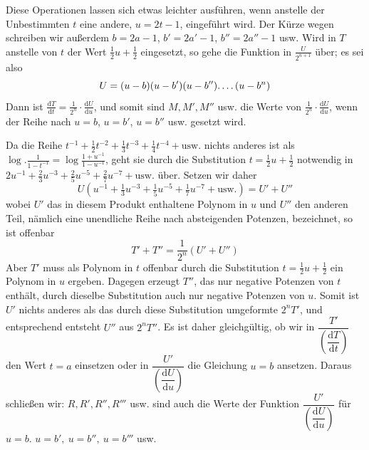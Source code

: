 Diese Operationen lassen sich etwas leichter ausführen, wenn anstelle der Unbestimmten $t$ eine andere, $u=2t-1$, eingeführt wird. Der Kürze wegen schreiben wir außerdem $b=2a-1$, $b'=2a'-1$, $b''=2a''-1$ usw. Wird in $T$ anstelle von $t$ der Wert $\tfrac12u+\tfrac12$ eingesetzt, so gehe die Funktion in $\frac{U}{2^{n+1}}$ über; es sei also
\[
U=(u-b)(u-b')(u-b'')\ldotp\ldotp\ldotp\ldotp(u-b^n)
\]
Dann ist $\frac{\mathrm{d}T}{\mathrm{d}t}=\frac{1}{2^n}\cdot\frac{\mathrm{d}U}{\mathrm{d}u}$, und somit sind $M,M',M''$ usw. die Werte von $\frac{1}{2^n}\cdot\frac{\mathrm{d}U}{\mathrm{d}u}$, wenn der Reihe nach $u=b$, $u=b'$, $u=b''$ usw. gesetzt wird.

Da die Reihe $t^{-1}+\tfrac12t^{-2}+\tfrac13t^{-3}+\tfrac14t^{-4}+\text{usw.}$ nichts anderes ist als $\log.\frac{1}{1-t^{-1}}=\log\frac{1+u^{-1}}{1-u^{-1}}$, geht sie durch die Substitution $t=\tfrac12u+\tfrac12$ notwendig in $2u^{-1}+\tfrac23u^{-3}+\tfrac25u^{-5}+\tfrac27u^{-7}+\text{usw.}$ über. Setzen wir daher
\[
U(u^{-1}+\tfrac13u^{-3}+\tfrac15u^{-5}+\tfrac17u^{-7}+\text{usw.})=U'+U''
\]
wobei $U'$ das in diesem Produkt enthaltene Polynom in $u$ und $U''$ den anderen Teil, nämlich eine unendliche Reihe nach absteigenden Potenzen, bezeichnet, so ist offenbar
\[
T'+T''=\frac{1}{2^n}(U'+U'')
\]
Aber $T'$ muss als Polynom in $t$ offenbar durch die Substitution $t=\tfrac12u+\tfrac12$ ein Polynom in $u$ ergeben. Dagegen erzeugt $T''$, das nur negative Potenzen von $t$ enthält, durch dieselbe Substitution auch nur negative Potenzen von $u$. Somit ist $U'$ nichts anderes als das durch diese Substitution umgeformte $2^nT'$, und entsprechend entsteht $U''$ aus $2^nT''$. Es ist daher gleichgültig, ob wir in $\dfrac{T'}{\left(\dfrac{\mathrm{d}T}{\mathrm{d}t}\right)}$ den Wert $t=a$ einsetzen oder in $\dfrac{U'}{\left(\dfrac{\mathrm{d}U}{\mathrm{d}u}\right)}$ die Gleichung $u=b$ ansetzen. Daraus schließen wir: $R, R', R'', R'''$ usw. sind auch die Werte der Funktion $\dfrac{U'}{\left(\dfrac{\mathrm{d}U}{\mathrm{d}u}\right)}$ für $u=b$. $u=b',\ u=b'',\ u=b'''$ usw.

